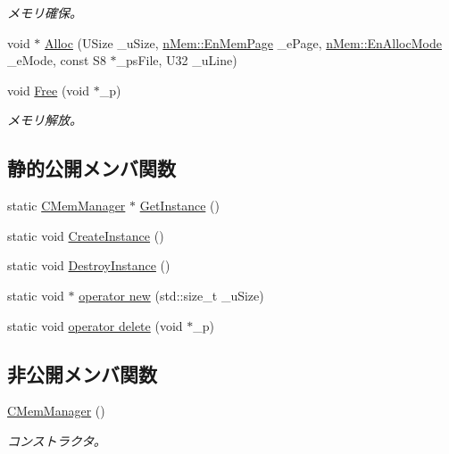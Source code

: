 \begin{DoxyCompactItemize}
\begin{DoxyCompactList}\small\item\em メモリ確保。 \end{DoxyCompactList}\item 
void $\ast$ \hyperlink{class_c_mem_manager_ad2ace63797f9b7b2e3076d089e81ad37}{Alloc} (U\+Size \+\_\+u\+Size, \hyperlink{namespacen_mem_a44d64d91225ba6c957054d2db885dfbe}{n\+Mem\+::\+En\+Mem\+Page} \+\_\+e\+Page, \hyperlink{namespacen_mem_aae5f274bd5d48f77be9c3142a1e83e8b}{n\+Mem\+::\+En\+Alloc\+Mode} \+\_\+e\+Mode, const S8 $\ast$\+\_\+ps\+File, U32 \+\_\+u\+Line)
\item 
void \hyperlink{class_c_mem_manager_a8e01b60428de8ef2366a4646b5eb0feb}{Free} (void $\ast$\+\_\+p)
\begin{DoxyCompactList}\small\item\em メモリ解放。 \end{DoxyCompactList}\end{DoxyCompactItemize}
\subsection*{静的公開メンバ関数}
\begin{DoxyCompactItemize}
\item 
static \hyperlink{class_c_mem_manager}{C\+Mem\+Manager} $\ast$ \hyperlink{class_c_mem_manager_aa00fe5753db30d47af12a76bfef9a0f5}{Get\+Instance} ()
\item 
static void \hyperlink{class_c_mem_manager_a56375ca3d766d27f389e85758fb0b07a}{Create\+Instance} ()
\item 
static void \hyperlink{class_c_mem_manager_a4ef244e50de56e5c7ff95c86a98e2a32}{Destroy\+Instance} ()
\item 
static void $\ast$ \hyperlink{class_c_mem_manager_a800271fde5145d8623e5f06694cc8cab}{operator new} (std\+::size\+\_\+t \+\_\+u\+Size)
\item 
static void \hyperlink{class_c_mem_manager_a51f73ea6de04c472301d7fa58ba605f3}{operator delete} (void $\ast$\+\_\+p)
\end{DoxyCompactItemize}
\subsection*{非公開メンバ関数}
\begin{DoxyCompactItemize}
\item 
\hyperlink{class_c_mem_manager_ad3b0307efbaccf48dc22821df642c7ad}{C\+Mem\+Manager} ()
\begin{DoxyCompactList}\small\item\em コンストラクタ。 \end{DoxyCompactList}\end{DoxyCompactItemize}
